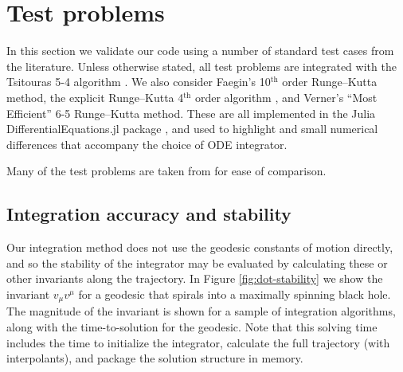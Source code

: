 \documentclass[fleqn,usenatbib]{mnras}
\begin{document}
\section{Test problems}
\label{sec:test-problems}

In this section we validate our code using a number of standard test cases from
the literature. Unless otherwise stated, all test problems are integrated with
the Tsitouras 5-4 algorithm \citep{tsitouras_rungekutta_2011}. We also consider
Faegin's 10$^\text{th}$ order Runge--Kutta method, the explicit Runge--Kutta
4$^\text{th}$ order algorithm \citep{press_numerical_2007}, and Verner's ``Most
Efficient'' 6-5 Runge--Kutta method.  These are all implemented in the Julia
DifferentialEquations.jl package \citep{rackauckas_differential_2017}, and used
to highlight and small numerical differences that accompany the choice of ODE
integrator.

Many of the test problems are taken from \citet{gold_verification_2020} for ease
of comparison.

\subsection{Integration accuracy and stability}

Our integration method does not use the geodesic constants of motion directly,
and so the stability of the integrator may be evaluated by calculating these or
other invariants along the trajectory. In Figure \ref{fig:dot-stability} we show
the invariant $v_\mu v^\mu$ for a geodesic that spirals into a maximally
spinning black hole. The magnitude of the invariant is shown for a sample of
integration algorithms, along with the time-to-solution for the geodesic. Note
that this solving time includes the time to initialize the integrator, calculate
the full trajectory (with interpolants), and package the solution structure in
memory.
\end{document}
